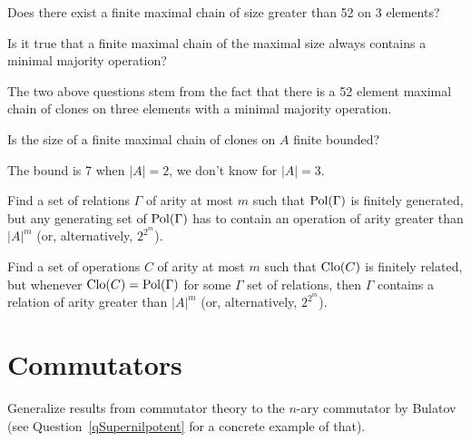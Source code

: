 \begin{question}
  Does there exist a finite maximal chain of size greater than 52 on 3
  elements?
\end{question}
\begin{question}
  Is it true that a finite maximal chain of the maximal size always
  contains a minimal majority operation?
\end{question}
\begin{context}
  The two above questions stem from the fact that there is a 52 element maximal
  chain of clones on three elements with a minimal majority operation.
\end{context}

\begin{question}
  Is the size of a finite maximal chain of clones on $A$ finite bounded?
\end{question}
\begin{context}
  The bound is 7 when $|A|=2$, we don't know for $|A|=3$.
\end{context}

\begin{question}
  Find a set of relations $\Gamma$ of arity at most $m$ such that
  $\operatorname{Pol}(\Gamma)$ is finitely generated, but any generating set
  of $\operatorname{Pol}(\Gamma)$ has to contain an operation of arity greater than $|A|^m$ (or,
  alternatively, $2^{2^m}$).
\end{question}

\begin{question}
  Find a set of operations $C$ of arity at most $m$ such that $\operatorname{Clo}(C)$ is
  finitely related, but whenever
  $\operatorname{Clo}(C)=\operatorname{Pol}(\Gamma)$ for some $\Gamma$ set of relations, then $\Gamma$
  contains a relation of arity greater than $|A|^m$ (or, alternatively,
  $2^{2^m}$).
\end{question}


\section{Commutators}
\begin{question}
Generalize results from commutator theory to the $n$-ary commutator by
Bulatov~\cite{bulatov-on-the-number-of-maltsevs} (see Question~\ref{qSupernilpotent} for a concrete example of
that).
\end{question}

